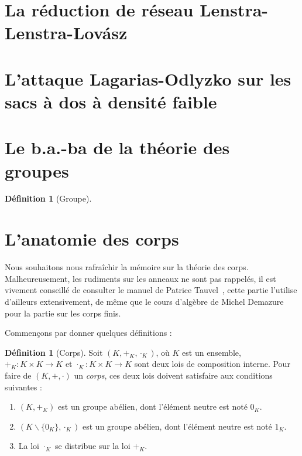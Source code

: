\documentclass[a4paper, titlepage]{article}
\theoremstyle{definition}
\newtheorem{defi}[theo]{Définition}
\theoremstyle{remark}
\begin{document}
\section{La réduction de réseau Lenstra-Lenstra-Lov\'asz}

\section{L'attaque Lagarias-Odlyzko sur les sacs à dos à densité faible}

\newpage
\appendix

\section{Le b.a.-ba de la théorie des groupes}
\begin{defi}[Groupe]

\end{defi}

\section{L'anatomie des corps}

Nous souhaitons nous rafraîchir la mémoire sur la théorie des corps. Malheureusement, les rudiments sur les anneaux ne sont pas rappelés, il est vivement conseillé de consulter le manuel de Patrice Tauvel~\cite{tauvel2008}, cette partie l'utilise d'ailleurs extensivement, de même que le cours d'algèbre de Michel Demazure~\cite{demazure2008} pour la partie sur les corps finis. 

Commençons par donner quelques définitions :

\begin{defi}[Corps]
Soit $(K,+_K,\cdot_K)$, où $K$ est un ensemble, $+_K : K \times K \rightarrow K$ et $\cdot_K: K \times K \rightarrow K$ sont deux lois de composition interne. Pour faire de $(K,+,\cdot)$ un \textit{corps}, ces deux lois doivent satisfaire aux conditions suivantes : \begin{enumerate}
\item $(K,+_K)$ est un groupe abélien, dont l'élément neutre est noté $0_K$.
\item $(K\backslash \{0_K\},\cdot_K)$ est un groupe abélien, dont l'élément neutre est noté $1_K$.
\item La loi $\cdot_K$ se distribue sur la loi $+_K$.
\end{enumerate}
\end{defi}
\end{document}
